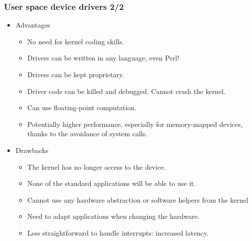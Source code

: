 \begin{frame}
  \frametitle{User space device drivers 2/2}
  \begin{itemize}
  \item Advantages
    \begin{itemize}
    \item No need for kernel coding skills.
    \item Drivers can be written in any language, even Perl!
    \item Drivers can be kept proprietary.
    \item Driver code can be killed and debugged. Cannot crash the
      kernel.
    \item Can use floating-point computation.
    \item Potentially higher performance, especially for
      memory-mapped devices, thanks to the avoidance of system calls.
    \end{itemize}
  \item Drawbacks
    \begin{itemize}
    \item The kernel has no longer access to the device.
    \item None of the standard applications will be able to use it.
    \item Cannot use any hardware abstraction or software helpers from
      the kernel
    \item Need to adapt applications when changing the hardware.
    \item Less straightforward to handle interrupts: increased latency.
    \end{itemize}
  \end{itemize}
\end{frame}

